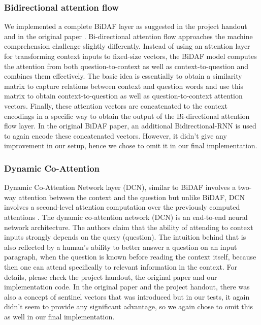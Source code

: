 \documentclass{article} %
\begin{document}
\subsubsection{Bidirectional attention flow}
We implemented a complete BiDAF layer as suggested in the project handout and in the original paper \cite{bidaf}. Bi-directional attention flow approaches the machine comprehension challenge slightly differently. Instead of using an attention layer for transforming context inputs to fixed-size vectors, the BiDAF model computes the attention from both question-to-context as well as context-to-question and combines them effectively.
The basic idea is essentially to obtain a similarity matrix to capture relations between context and question words and use this matrix to obtain context-to-question as well as question-to-context attention vectors. Finally, these attention vectors are concatenated to the context encodings in a specific way to obtain the output of the Bi-directional attention flow layer. In the original BiDAF paper, an additional Bidirectional-RNN is used to again encode these concatenated vectors. However, it didn't give any improvement in our setup, hence we chose to omit it in our final implementation.

\subsubsection{Dynamic Co-Attention}
Dynamic Co-Attention Network layer (DCN), similar to BiDAF involves a two-way attention between the context and the question but unlike BiDAF, DCN involves a second-level attention computation over the previously computed attentions \cite{coatten}. The dynamic co-attention network (DCN) is an end-to-end neural network architecture. The authors claim that the ability of attending to context inputs strongly depends on the query (question). The intuition behind that is also reflected by a human's ability to better answer a question on an input paragraph, when the question is known before reading the context itself, because then one can attend specifically to relevant information in the context. For details, please check the project handout, the original paper and our implementation code. In the original paper and the project handout, there was also a concept of sentinel vectors that was introduced but in our tests, it again didn't seem to provide any significant advantage, so we again chose to omit this as well in our final implementation. 
\end{document}
